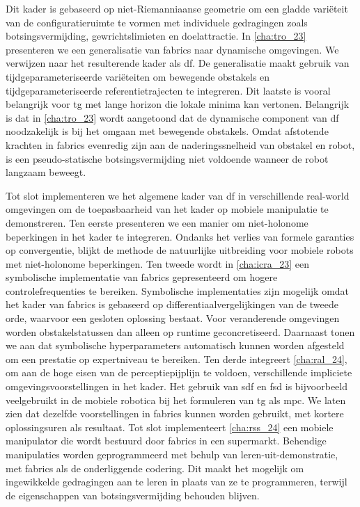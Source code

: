 Dit kader is gebaseerd op niet-Riemanniaanse geometrie om een gladde variëteit
van de configuratieruimte te vormen met individuele gedragingen zoals
botsingsvermijding, gewrichtslimieten en doelattractie. In \cref{cha:tro_23}
presenteren we een generalisatie van \ac{fabrics} naar dynamische omgevingen. We
verwijzen naar het resulterende kader als \ac{df}. De generalisatie maakt
gebruik van tijdgeparameteriseerde variëteiten om bewegende obstakels en
tijdgeparameteriseerde referentietrajecten te integreren. Dit laatste is vooral
belangrijk voor \ac{tg} met lange horizon die lokale minima kan vertonen.
Belangrijk is dat in \cref{cha:tro_23} wordt aangetoond dat de dynamische
component van \ac{df} noodzakelijk is bij het omgaan met bewegende obstakels.
Omdat afstotende krachten in \ac{fabrics} evenredig zijn aan de
naderingssnelheid van obstakel en robot, is een pseudo-statische
botsingsvermijding niet voldoende wanneer de robot langzaam beweegt.

Tot slot implementeren we het algemene kader van \ac{df} in verschillende
real-world omgevingen om de toepasbaarheid van het kader op mobiele manipulatie
te demonstreren. Ten eerste presenteren we een manier om niet-holonome
beperkingen in het kader te integreren. Ondanks het verlies van formele
garanties op convergentie, blijkt de methode de natuurlijke uitbreiding voor
mobiele robots met niet-holonome beperkingen. Ten tweede wordt in
\cref{cha:icra_23} een symbolische implementatie van \ac{fabrics} gepresenteerd
om hogere controlefrequenties te bereiken. Symbolische implementaties zijn
mogelijk omdat het kader van \ac{fabrics} is gebaseerd op
differentiaalvergelijkingen van de tweede orde, waarvoor een gesloten oplossing
bestaat. Voor veranderende omgevingen worden obstakelstatussen dan alleen op
runtime geconcretiseerd. Daarnaast tonen we aan dat symbolische hyperparameters
automatisch kunnen worden afgesteld om een prestatie op expertniveau te
bereiken. Ten derde integreert \cref{cha:ral_24}, om aan de hoge eisen van de
perceptiepijplijn te voldoen, verschillende impliciete omgevingsvoorstellingen
in het kader. Het gebruik van \acf{sdf} en \acf{fsd} is bijvoorbeeld
veelgebruikt in de mobiele robotica bij het formuleren van \ac{tg} als \ac{mpc}.
We laten zien dat dezelfde voorstellingen in \ac{fabrics} kunnen worden
gebruikt, met kortere oplossingsuren als resultaat. Tot slot implementeert
\cref{cha:rss_24} een mobiele manipulator die wordt bestuurd door \ac{fabrics}
in een supermarkt. Behendige manipulaties worden geprogrammeerd met behulp van
leren-uit-demonstratie, met \ac{fabrics} als de onderliggende codering. Dit
maakt het mogelijk om ingewikkelde gedragingen aan te leren in plaats van ze te
programmeren, terwijl de eigenschappen van botsingsvermijding behouden blijven.

